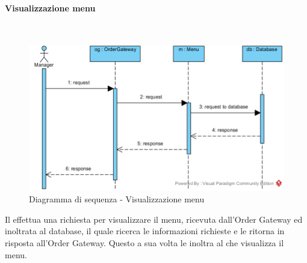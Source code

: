 \begin{samepage}
\paragraph{Visualizzazione menu}\mbox{}\\
\end{samepage}
\begin{figure}[H]
	\centering
	\includegraphics[width=15cm]{../../documenti/SpecificaTecnica/diagrammi_img/sequenza/direttore_visualizza_menu.png}
	\caption{Diagramma di sequenza - Visualizzazione menu}
\end{figure}
Il \Manager{} effettua una richiesta per visualizzare il menu, ricevuta dall'Order Gateway ed inoltrata al database, il quale ricerca le informazioni richieste e le ritorna in risposta all'Order Gateway. Questo a sua volta le inoltra al \Manager{} che visualizza il menu.

